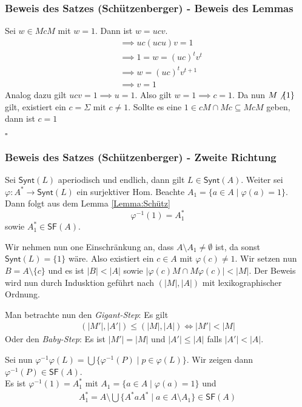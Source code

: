\documentclass[12pt, german]{article}
\newcommand{\inv}{^{-1}}
\newcommand{\starfree}{\mathsf{SF}}
\newcommand{\synt}{\mathsf{Synt}}
\newcommand{\aast}{A^{\ast}}
\newcommand{\bewiesen}{
	
	\begin{flushright}
		$\square$  \\
\end{flushright}}
\begin{document}
	\subsubsection{Beweis des Satzes (Schützenberger) - Beweis des Lemmas}
	Sei $w \in McM$ mit $w = 1$. Dann ist $w = ucv$. 
	\begin{align*}
		&\implies uc(ucu)v = 1 \\
		&\implies 1 = w = (uc)^t v^t \\
		&\implies w = (uc)^t v^{t+1} \\
		&\implies v = 1
	\end{align*}
	Analog dazu gilt $ucv = 1 \implies u = 1$. Also gilt $w = 1 \implies c = 1$. 
	Da nun $M \not \{1\}$ gilt, existiert ein $c = \Sigma$ mit $c \not = 1$. Sollte es eine $1 \in cM \cap Mc \subseteq McM$ geben, dann ist $c = 1$
	\bewiesen
	
	\subsubsection{Beweis des Satzes (Schützenberger) - Zweite Richtung}
	Sei $\synt(L)$ aperiodisch und endlich, dann gilt $ L \in \synt(A)$. Weiter sei $\varphi: \aast \to \synt(L)$ ein surjektiver Hom. Beachte $A_1 = \{a \in A \mid \varphi(a) = 1\}$.
	Dann folgt aus dem Lemma \ref{Lemma:Schütz} $$\varphi\inv(1) = \aast_1$$ sowie $\aast_1 \in \starfree(A)$.
	\newline
	
	Wir nehmen nun one Einschränkung an, dass $A\setminus A_1 \not = \emptyset$ ist, da sonst $\synt(L) = \{1\}$ wäre. Also existiert ein $c \in A$ mit $\varphi(c) \not = 1$. Wir setzen nun $B = A \setminus \{c\}$ und es ist $|B| < |A|$ sowie $|\varphi(c)M \cap M\varphi(c)|< |M|$. 
	Der Beweis wird nun durch Indusktion geführt nach $(|M|, |A|)$ mit lexikographischer Ordnung. 
	\newline
	
	Man betrachte nun den \textit{Gigant-Step}: Es gilt
	\begin{align*}
		(|M'|, |A'|) \leq (|M|, |A|) \iff |M'| < |M|
	\end{align*}
	Oder  den \textit{Baby-Step}: Es ist $|M'| = |M|$ und $|A'| \leq |A|$ falls $|A'| < |A|$. 
	\newline
	
	Sei nun $\varphi\inv\varphi(L) = \bigcup \{\varphi\inv(P) \mid p \in \varphi(L)\}$. Wir zeigen dann $ \varphi\inv(P) \in \starfree(A)$. \\ 
	Es ist $\varphi\inv(1) = \aast_1$ mit $A_1 = \{a \in A \mid \varphi(a) = 1\}$ und 
	\begin{align*}
		\aast_1 = A \setminus \bigcup \{\aast a \aast \mid  a \in A \setminus A_1\} \in \starfree(A)
	\end{align*}
	
\end{document}
